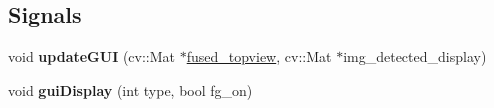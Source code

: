 \subsection*{Signals}
\begin{DoxyCompactItemize}
\item 
\hypertarget{class_sensor_info_a4319ce78ed6efa273de1353d7dc687ae}{}void {\bfseries update\+G\+U\+I} (cv\+::\+Mat $\ast$\hyperlink{class_sensor_info_a8862f0f8415919416a94165f31542222}{fused\+\_\+topview}, cv\+::\+Mat $\ast$img\+\_\+detected\+\_\+display)\label{class_sensor_info_a4319ce78ed6efa273de1353d7dc687ae}

\item 
\hypertarget{class_sensor_info_a41a6018d7dfa24a65dfa3510c730765c}{}void {\bfseries gui\+Display} (int type, bool fg\+\_\+on)\label{class_sensor_info_a41a6018d7dfa24a65dfa3510c730765c}

\end{DoxyCompactItemize}
